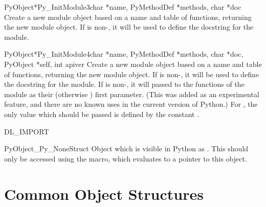 \begin{cfuncdesc}{PyObject*}{Py_InitModule3}{char *name,
                                             PyMethodDef *methods,
                                             char *doc}
  Create a new module object based on a name and table of functions,
  returning the new module object.  If  is non-\NULL, it will
  be used to define the docstring for the module.

\end{cfuncdesc}

\begin{cfuncdesc}{PyObject*}{Py_InitModule4}{char *name,
                                             PyMethodDef *methods,
                                             char *doc, PyObject *self,
                                             int apiver}
  Create a new module object based on a name and table of functions,
  returning the new module object.  If  is non-\NULL, it will
  be used to define the docstring for the module.  If  is
  non-\NULL, it will passed to the functions of the module as their
  (otherwise \NULL) first parameter.  (This was added as an
  experimental feature, and there are no known uses in the current
  version of Python.)  For , the only value which should
  be passed is defined by the constant .


\end{cfuncdesc}

DL_IMPORT

\begin{cvardesc}{PyObject}{_Py_NoneStruct}
  Object which is visible in Python as .  This should only
  be accessed using the  macro, which evaluates to a
  pointer to this object.
\end{cvardesc}


\section{Common Object Structures \label{common-structs}}

